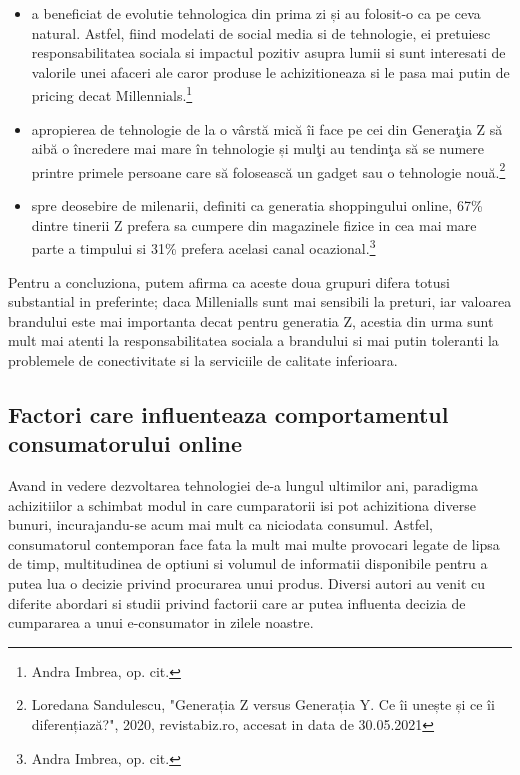 \documentclass[a4paper, 12pt]{article}
\begin{document}
		\begin{itemize}
			\item a beneficiat de evolutie tehnologica din prima zi și au folosit-o ca pe ceva natural. Astfel, fiind modelati de social media si de tehnologie, ei pretuiesc responsabilitatea sociala si impactul pozitiv asupra lumii si sunt interesati de valorile unei afaceri ale caror produse le achizitioneaza si le pasa mai putin de pricing decat Millennials.\footnote{Andra Imbrea, op. cit.}
			\item apropierea de tehnologie de la o vârstă mică îi face pe cei din Generaţia Z să aibă o încredere mai mare în tehnologie și mulţi au tendinţa să se numere printre primele persoane care să folosească un gadget sau o tehnologie nouă.\footnote{Loredana Sandulescu, "Generația Z versus Generația Y. Ce îi unește și ce îi diferențiază?", 2020, revistabiz.ro, accesat in data de 30.05.2021 }
			\item spre deosebire de milenarii, definiti ca generatia shoppingului online, 67\% dintre tinerii Z prefera sa cumpere din magazinele fizice in cea mai mare parte a timpului si 31\% prefera acelasi canal ocazional.\footnote{Andra Imbrea, op. cit.}
		\end{itemize}	
			
		\quad Pentru a concluziona, putem afirma ca aceste doua grupuri difera totusi substantial in preferinte; daca Millenialls sunt mai sensibili la preturi, iar valoarea brandului este mai importanta decat pentru generatia Z, acestia din urma sunt mult mai atenti la responsabilitatea sociala a brandului si mai putin toleranti la problemele de conectivitate si la serviciile de calitate inferioara.
		\subsection{Factori care influenteaza comportamentul consumatorului online}
	\qquad\space Avand in vedere dezvoltarea tehnologiei de-a lungul ultimilor ani,  paradigma achizitiilor a schimbat modul in care cumparatorii isi pot achizitiona diverse bunuri, incurajandu-se acum mai mult ca niciodata consumul. Astfel, consumatorul contemporan face fata la mult mai multe provocari legate de lipsa de timp, multitudinea de optiuni si volumul de informatii disponibile pentru a putea lua o decizie privind procurarea unui produs. Diversi autori au venit cu diferite abordari si studii privind factorii care ar putea influenta decizia de cumpararea a unui e-consumator in zilele noastre.
	
\end{document}
